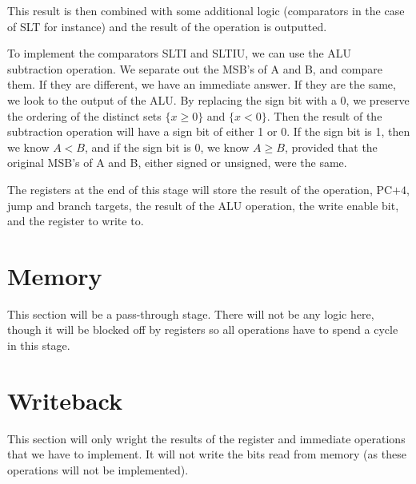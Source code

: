 \documentclass{article}
\begin{document}
This result is then combined with some additional logic (comparators in the case of SLT for instance) and the result of the operation is outputted.

To implement the comparators SLTI and SLTIU, we can use the ALU subtraction operation. We separate out the MSB's of A and B, and compare them. If they are different, we have an immediate answer. If they are the same, we look to the output of the ALU. By replacing the sign bit with a 0, we preserve the ordering of the distinct sets $\{x \geq 0\}$ and $\{x < 0\}$. Then the result of the subtraction operation will have a sign bit of either 1 or 0. If the sign bit is 1, then we know $A < B$, and if the sign bit is 0, we know $A \geq B$, provided that the original MSB's of A and B, either signed or unsigned, were the same. 

The registers at the end of this stage will store the result of the operation, PC$+4$, jump and branch targets, the result of the ALU operation, the write enable bit, and the register to write to.

\section*{Memory}
This section will be a pass-through stage. There will not be any logic here, though it will be blocked off by registers so all operations have to spend a cycle in this stage.

\section*{Writeback}
This section will only wright the results of the register and immediate operations that we have to implement.  It will not write the bits read from memory (as these operations will not be implemented).
\end{document}
